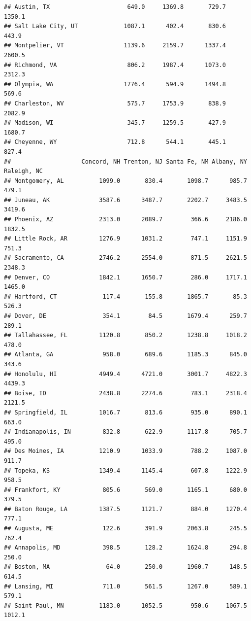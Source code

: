 \documentclass[
]{article}
\begin{document}
\begin{verbatim}
## Austin, TX                      649.0     1369.8       729.7          1350.1
## Salt Lake City, UT             1087.1      402.4       830.6           443.9
## Montpelier, VT                 1139.6     2159.7      1337.4          2600.5
## Richmond, VA                    806.2     1987.4      1073.0          2312.3
## Olympia, WA                    1776.4      594.9      1494.8           569.6
## Charleston, WV                  575.7     1753.9       838.9          2082.9
## Madison, WI                     345.7     1259.5       427.9          1680.7
## Cheyenne, WY                    712.8      544.1       445.1           827.4
##                    Concord, NH Trenton, NJ Santa Fe, NM Albany, NY Raleigh, NC
## Montgomery, AL          1099.0       830.4       1098.7      985.7       479.1
## Juneau, AK              3587.6      3487.7       2202.7     3483.5      3419.6
## Phoenix, AZ             2313.0      2089.7        366.6     2186.0      1832.5
## Little Rock, AR         1276.9      1031.2        747.1     1151.9       751.3
## Sacramento, CA          2746.2      2554.0        871.5     2621.5      2348.3
## Denver, CO              1842.1      1650.7        286.0     1717.1      1465.0
## Hartford, CT             117.4       155.8       1865.7       85.3       526.3
## Dover, DE                354.1        84.5       1679.4      259.7       289.1
## Tallahassee, FL         1120.8       850.2       1238.8     1018.2       478.0
## Atlanta, GA              958.0       689.6       1185.3      845.0       343.6
## Honolulu, HI            4949.4      4721.0       3001.7     4822.3      4439.3
## Boise, ID               2438.8      2274.6        783.1     2318.4      2121.5
## Springfield, IL         1016.7       813.6        935.0      890.1       663.0
## Indianapolis, IN         832.8       622.9       1117.8      705.7       495.0
## Des Moines, IA          1210.9      1033.9        788.2     1087.0       911.7
## Topeka, KS              1349.4      1145.4        607.8     1222.9       958.5
## Frankfort, KY            805.6       569.0       1165.1      680.0       379.5
## Baton Rouge, LA         1387.5      1121.7        884.0     1270.4       777.1
## Augusta, ME              122.6       391.9       2063.8      245.5       762.4
## Annapolis, MD            398.5       128.2       1624.8      294.8       250.0
## Boston, MA                64.0       250.0       1960.7      148.5       614.5
## Lansing, MI              711.0       561.5       1267.0      589.1       579.1
## Saint Paul, MN          1183.0      1052.5        950.6     1067.5      1012.1

\end{verbatim}
\end{document}

